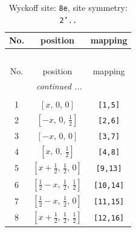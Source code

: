 \documentclass[fleqn,8pt]{jsarticle}
\begin{document}
\renewcommand{\arraystretch}{1.2}
\begin{longtable}{ccc}
\caption{Wyckoff site: {\tt 8e}, site symmetry: {\tt 2'..}}
 \\
 \hline \hline
No. & position & mapping \\ \hline \endfirsthead

\multicolumn{2}{l}{\tablename\ \thetable{}} \\
 \hline \hline
No. & position & mapping \\ \hline \endhead

 \hline \hline
\multicolumn{2}{r}{\footnotesize\it continued ...} \\ \endfoot

 \hline \hline
\multicolumn{2}{r}{} \\ \endlastfoot

1 & $\left[ x,\, 0,\, 0 \right]$ & {\tt [1,5]} \\ \hline
2 & $\left[ - x,\, 0,\, \frac{1}{2} \right]$ & {\tt [2,6]} \\ \hline
3 & $\left[ - x,\, 0,\, 0 \right]$ & {\tt [3,7]} \\ \hline
4 & $\left[ x,\, 0,\, \frac{1}{2} \right]$ & {\tt [4,8]} \\ \hline
5 & $\left[ x + \frac{1}{2},\, \frac{1}{2},\, 0 \right]$ & {\tt [9,13]} \\ \hline
6 & $\left[ \frac{1}{2} - x,\, \frac{1}{2},\, \frac{1}{2} \right]$ & {\tt [10,14]} \\ \hline
7 & $\left[ \frac{1}{2} - x,\, \frac{1}{2},\, 0 \right]$ & {\tt [11,15]} \\ \hline
8 & $\left[ x + \frac{1}{2},\, \frac{1}{2},\, \frac{1}{2} \right]$ & {\tt [12,16]} \\
\end{longtable}
\renewcommand{\arraystretch}{1.2}
\end{document}
